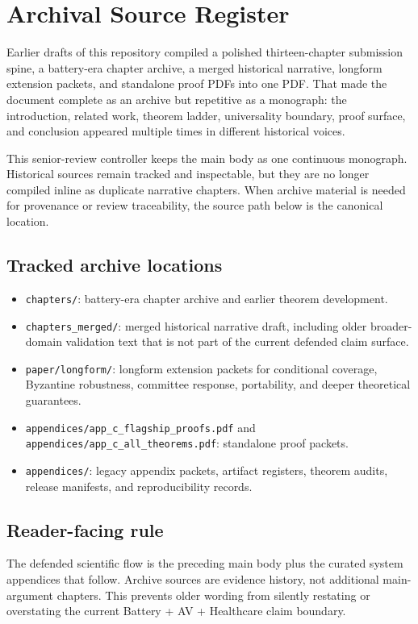 \documentclass[12pt,oneside]{book}
\begin{document}
\chapter{Archival Source Register}
\label{ch:archival-source-register}

Earlier drafts of this repository compiled a polished thirteen-chapter
submission spine, a battery-era chapter archive, a merged historical narrative,
longform extension packets, and standalone proof PDFs into one PDF. That made
the document complete as an archive but repetitive as a monograph: the
introduction, related work, theorem ladder, universality boundary, proof
surface, and conclusion appeared multiple times in different historical voices.

This senior-review controller keeps the main body as one continuous monograph.
Historical sources remain tracked and inspectable, but they are no longer
compiled inline as duplicate narrative chapters. When archive material is
needed for provenance or review traceability, the source path below is the
canonical location.

\section{Tracked archive locations}
\begin{itemize}
  \item \texttt{chapters/}: battery-era chapter archive and earlier theorem
  development.
  \item \texttt{chapters\_merged/}: merged historical narrative draft,
  including older broader-domain validation text that is not part of the
  current defended claim surface.
  \item \texttt{paper/longform/}: longform extension packets for conditional
  coverage, Byzantine robustness, committee response, portability, and deeper
  theoretical guarantees.
  \item \texttt{appendices/app\_c\_flagship\_proofs.pdf} and
  \texttt{appendices/app\_c\_all\_theorems.pdf}: standalone proof packets.
  \item \texttt{appendices/}: legacy appendix packets, artifact registers,
  theorem audits, release manifests, and reproducibility records.
\end{itemize}

\section{Reader-facing rule}
The defended scientific flow is the preceding main body plus the curated system
appendices that follow. Archive sources are evidence history, not additional
main-argument chapters. This prevents older wording from silently restating or
overstating the current Battery + AV + Healthcare claim boundary.
\end{document}
